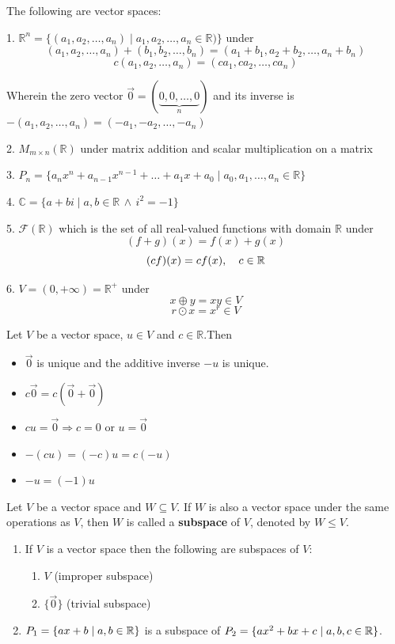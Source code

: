 \begin{example}
The following are vector spaces:

1. $\mathbb{R}^n = \{(a_1, a_2, \dots, a_n) \mid a_1, a_2, \dots, a_n \in \mathbb{R})\}$ under 
$$(a_1, a_2, \dots, a_n) + (b_1, b_2, \dots, b_n) = (a_1 + b_1, a_2 + b_2, \dots, a_n + b_n)$$
$$c(a_1, a_2, \dots, a_n) = (ca_1, ca_2, \dots, ca_n)$$

Wherein the zero vector $\vec{0} = (\underbrace{0, 0, \dots, 0}_n)$ and its inverse is $-(a_1, a_2, \dots, a_n) = (-a_1, -a_2, \dots, -a_n)$

2. $M_{m \times n}(\mathbb{R})$ under matrix addition and scalar multiplication on a matrix

3. $P_n = \{a_nx^n + a_{n-1}x^{n-1} + \dots + a_1x + a_0 \mid a_0, a_1, \dots, a_n \in \mathbb{R}\}$

4. $\mathbb{C} = \{a + bi \mid a, b \in \mathbb{R}\, \land \, i^2 = -1\}$

5. $\mathscr{F}(\mathbb{R})$ which is the set of all real-valued functions with domain $\mathbb{R}$ under
$$(f + g)(x) = f(x) + g(x)$$
$$(cf)(x) = cf(x) , \quad c \in \mathbb{R}$$

6. $V = (0, +\infty) = \mathbb{R}^+$ under
$$x \oplus y = xy \in V$$ 
$$r \odot x = x^r \in V$$


\end{example}

\begin{theorem}
Let $V$ be a vector space, $u \in V$ and $c \in \mathbb{R}$.Then
\begin{itemize}
    \item $\vec{0}$ is unique and the additive inverse $-u$ is unique.
    \item $c\vec{0} = c(\vec{0} + \vec{0})$
    \item $cu = \vec{0} \Longrightarrow c = 0 \text{ or } u = \vec{0}$
    \item $-(cu) = (-c)u = c(-u)$
    \item $-u = (-1)u$
\end{itemize}
\end{theorem}

\begin{definition}
Let $V$ be a vector space and $W \subseteq V$. If $W$ is also a vector space under the same operations as $V$, then $W$ is called a \textbf{subspace} of $V$, denoted by $W \leq V$.
\end{definition}

\begin{example}
\leavevmode
\begin{enumerate}
    \item If $V$ is a vector space then the following are subspaces of $V$:
    \begin{enumerate}
        \item $V$ (improper subspace)
        \item $\{\vec{0}\}$ (trivial subspace)
    \end{enumerate}
    \item $P_1 = \{ax + b \mid a, b \in \mathbb{R}\}$ is a subspace of $P_2 = \{ax^2 + bx + c \mid a, b, c \in \mathbb{R}\}$.
\end{enumerate}
\end{example}

